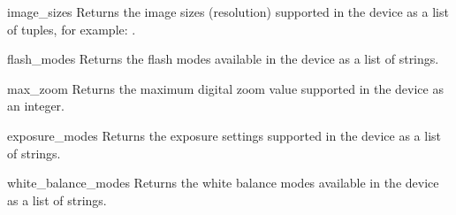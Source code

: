 \begin{funcdesc}{image_sizes}{}
Returns the image sizes (resolution) supported in the device as a list of 
 tuples, for example: \code{[(640, 480), (160, 120)]}.
\end{funcdesc}

\begin{funcdesc}{flash_modes}{}
Returns the flash modes available in the device as a list of strings. 
\end{funcdesc}

\begin{funcdesc}{max_zoom}{}
Returns the maximum digital zoom value supported in the device as an 
integer. 
\end{funcdesc}

\begin{funcdesc}{exposure_modes}{}
Returns the exposure settings supported in the device as a list of strings. 
\end{funcdesc}

\begin{funcdesc}{white_balance_modes}{}
Returns the white balance modes available in the device as a list of 
strings. 
\end{funcdesc}

